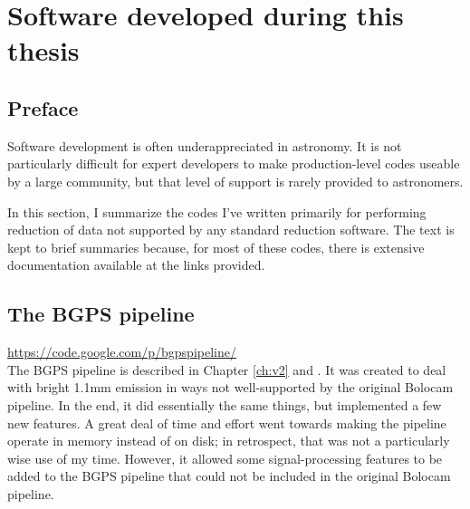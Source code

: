 
\chapter{Software developed during this thesis}
\label{ch:software}
\section{Preface}
Software development is often underappreciated in astronomy.  It is not
particularly difficult for expert developers to make production-level codes
useable by a large community, but that level of support is rarely provided to
astronomers.  


In this section, I summarize the codes I've written primarily for performing
reduction of data not supported by any standard reduction software.  The text
is kept to brief summaries because, for most of these codes, there is extensive
documentation available at the links provided.

\section{The BGPS pipeline}
\label{sec:bgpspipeline}
\url{https://code.google.com/p/bgpspipeline/} \\
The BGPS pipeline is described in Chapter \ref{ch:v2} and \citet{Aguirre2011}.
It was created to deal with bright 1.1mm emission in ways not well-supported 
by the original Bolocam pipeline.  In the end, it did essentially the same
things, but implemented a few new features.  A great deal of time and effort
went towards making the pipeline operate in memory instead of on disk; in
retrospect, that was not a particularly wise use of my time.  However, it
allowed some signal-processing features to be added to the BGPS pipeline that
could not be included in the original Bolocam pipeline.  

